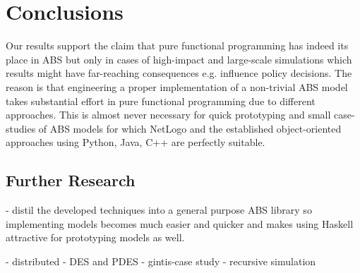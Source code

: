 \section{Conclusions}
Our results support the claim that pure functional programming has indeed its place in ABS but only in cases of high-impact and large-scale simulations which results might have far-reaching consequences e.g. influence policy decisions. The reason is that engineering a proper implementation of a non-trivial ABS model takes substantial effort in pure functional programming due to different approaches. This is almost never necessary for quick prototyping and small case-studies of ABS models for which NetLogo and the established object-oriented approaches using Python, Java, C++ are perfectly suitable.

\subsection{Further Research}
- distil the developed techniques into a general purpose ABS library so implementing models becomes much easier and quicker and makes using Haskell attractive for prototyping models as well.

- distributed
- DES and PDES
- gintis-case study
- recursive simulation